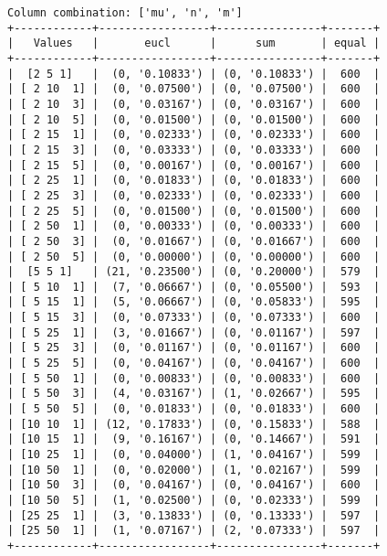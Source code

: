 \documentclass{article}
\begin{document}
\begin{verbatim}
Column combination: ['mu', 'n', 'm']
+------------+-----------------+----------------+-------+
|   Values   |       eucl      |      sum       | equal |
+------------+-----------------+----------------+-------+
|  [2 5 1]   |  (0, '0.10833') | (0, '0.10833') |  600  |
| [ 2 10  1] |  (0, '0.07500') | (0, '0.07500') |  600  |
| [ 2 10  3] |  (0, '0.03167') | (0, '0.03167') |  600  |
| [ 2 10  5] |  (0, '0.01500') | (0, '0.01500') |  600  |
| [ 2 15  1] |  (0, '0.02333') | (0, '0.02333') |  600  |
| [ 2 15  3] |  (0, '0.03333') | (0, '0.03333') |  600  |
| [ 2 15  5] |  (0, '0.00167') | (0, '0.00167') |  600  |
| [ 2 25  1] |  (0, '0.01833') | (0, '0.01833') |  600  |
| [ 2 25  3] |  (0, '0.02333') | (0, '0.02333') |  600  |
| [ 2 25  5] |  (0, '0.01500') | (0, '0.01500') |  600  |
| [ 2 50  1] |  (0, '0.00333') | (0, '0.00333') |  600  |
| [ 2 50  3] |  (0, '0.01667') | (0, '0.01667') |  600  |
| [ 2 50  5] |  (0, '0.00000') | (0, '0.00000') |  600  |
|  [5 5 1]   | (21, '0.23500') | (0, '0.20000') |  579  |
| [ 5 10  1] |  (7, '0.06667') | (0, '0.05500') |  593  |
| [ 5 15  1] |  (5, '0.06667') | (0, '0.05833') |  595  |
| [ 5 15  3] |  (0, '0.07333') | (0, '0.07333') |  600  |
| [ 5 25  1] |  (3, '0.01667') | (0, '0.01167') |  597  |
| [ 5 25  3] |  (0, '0.01167') | (0, '0.01167') |  600  |
| [ 5 25  5] |  (0, '0.04167') | (0, '0.04167') |  600  |
| [ 5 50  1] |  (0, '0.00833') | (0, '0.00833') |  600  |
| [ 5 50  3] |  (4, '0.03167') | (1, '0.02667') |  595  |
| [ 5 50  5] |  (0, '0.01833') | (0, '0.01833') |  600  |
| [10 10  1] | (12, '0.17833') | (0, '0.15833') |  588  |
| [10 15  1] |  (9, '0.16167') | (0, '0.14667') |  591  |
| [10 25  1] |  (0, '0.04000') | (1, '0.04167') |  599  |
| [10 50  1] |  (0, '0.02000') | (1, '0.02167') |  599  |
| [10 50  3] |  (0, '0.04167') | (0, '0.04167') |  600  |
| [10 50  5] |  (1, '0.02500') | (0, '0.02333') |  599  |
| [25 25  1] |  (3, '0.13833') | (0, '0.13333') |  597  |
| [25 50  1] |  (1, '0.07167') | (2, '0.07333') |  597  |
+------------+-----------------+----------------+-------+
\end{verbatim}
\end{document}
